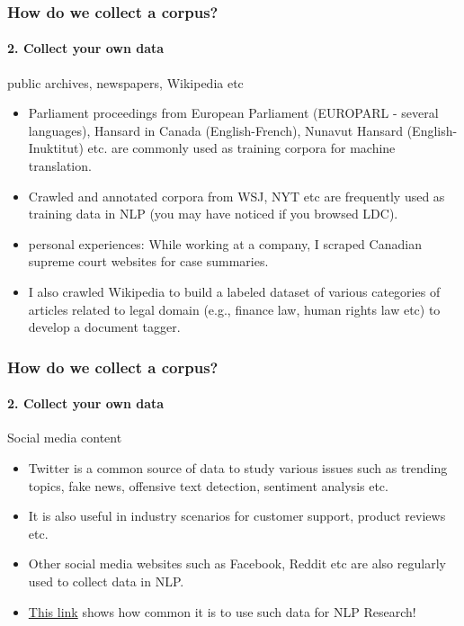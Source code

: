\documentclass{beamer}
\begin{document}
\begin{frame}
\frametitle{How do we collect a corpus?}
\framesubtitle{2. Collect your own data}
public archives, newspapers, Wikipedia etc
\begin{itemize}
    \item Parliament proceedings from European Parliament (EUROPARL - several languages), Hansard in Canada (English-French), Nunavut Hansard (English-Inuktitut) etc. are commonly used as training corpora for machine translation.
    \item Crawled and annotated corpora from WSJ, NYT etc are frequently used as training data in NLP (you may have noticed if you browsed LDC). \pause
\pause    \item personal experiences:  While working at a company, I scraped Canadian supreme court websites for case summaries. \pause
\item I also crawled Wikipedia to build a labeled dataset of various categories of articles related to legal domain (e.g., finance law, human rights law etc) to develop a document tagger.
\end{itemize}
\end{frame}

\begin{frame}
\frametitle{How do we collect a corpus?}
\framesubtitle{2. Collect your own data}
Social media content
\begin{itemize}
    \item Twitter is a common source of data to study various issues such as trending topics, fake news, offensive text detection, sentiment analysis etc.
    \item It is also useful in industry scenarios for customer support, product reviews etc.
    \item Other social media websites such as Facebook, Reddit etc are also regularly used to collect data in NLP. 
    \item \href{https://www.aclweb.org/anthology/search/?q=twitter}{This link} shows how common it is to use such data for NLP Research!
\end{itemize}
\end{frame}
\end{document}
